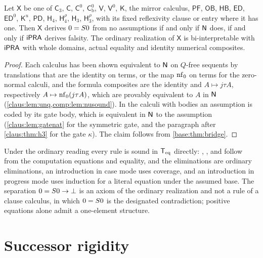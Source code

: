 \begin{corollary}[Bi-interpretability]
\label{claus:cor:bridge}
Let $\mathsf{X}$ be one of $\mathsf{C}_3$, $\mathsf{C}$, $\mathsf{C}^{0}$,
$\mathsf{C}^{0}_{\mathrm{b}}$, $\mathsf{V}$, $\mathsf{V}^{0}$,
$\mathsf{K}$, the mirror calculus, $\mathsf{PF}$, $\mathsf{OB}$,
$\mathsf{HB}$, $\mathsf{ED}$, $\mathsf{ED}^{0}$, $\mathsf{K}^{u}$,
$\mathsf{PD}$, $\mathsf{H}_4$, $\mathsf{H}_4^{\rho}$, $\mathsf{H}_3$,
$\mathsf{H}_3^{\rho}$, with its fixed
reflexivity clause or entry where it has one. Then $\mathsf{X}$ derives
$0=S 0$ from no assumptions if and only if $\mathsf{N}$ does, if and only if
$\mathsf{iPRA}$ derives falsity. The ordinary realization of $\mathsf{X}$ is
bi-interpretable with $\mathsf{iPRA}$ with whole domains, actual equality and
identity numerical composites.
\end{corollary}
\begin{proof}
Each calculus has been shown equivalent to $\mathsf{N}$ on $Q$-free sequents by
translations that are the identity on terms, or the map $\operatorname{nf}_0$ on terms
for the zero-normal calculi, and the formula composites are the identity
and $A\mapsto j\tau A$, respectively $A\mapsto\operatorname{nf}_0(j\tau A)$, which are
provably equivalent to $A$ in $\mathsf{N}$
(\cref{claus:lem:unq,comp:lem:nusound}). In the calculi with bodies an
assumption is coded by its gate body, which is equivalent in $\mathsf{N}$ to the
assumption (\cref{claus:lem:gatenat} for the symmetric gate, and the
paragraph after \cref{claus:thm:h3} for the gate $\kappa$). The claim follows from
\cref{base:thm:bridge}.
\end{proof}

Under the ordinary reading every rule is sound in $\mathsf{T}_{\mathrm{eq}}$ directly:
, ,  and 
follow from the computation equations and equality,  and
the eliminations are ordinary eliminations, an introduction in case mode
uses coverage, and an introduction in progress mode uses induction for a
literal equation under the assumed base. The separation
$0=S 0\to\bot$ is an axiom of the ordinary realization and not a rule
of a clause calculus, in which $0=S 0$ is the designated contradiction;
positive equations alone admit a one-element structure.

\section{Successor rigidity}
\label{claus:sec:rigidity}

